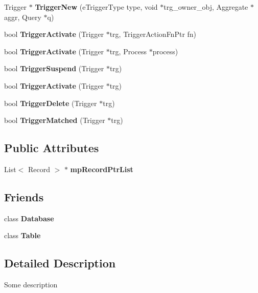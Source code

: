 \begin{CompactItemize}
\item 
Trigger $\ast$ {\bf Trigger\-New} (e\-Trigger\-Type type, void $\ast$trg\_\-owner\_\-obj, Aggregate $\ast$aggr, Query $\ast$q)\label{classView_a10}

\item 
bool {\bf Trigger\-Activate} (Trigger $\ast$trg, Trigger\-Action\-Fn\-Ptr fn)\label{classView_a11}

\item 
bool {\bf Trigger\-Activate} (Trigger $\ast$trg, Process $\ast$process)\label{classView_a12}

\item 
bool {\bf Trigger\-Suspend} (Trigger $\ast$trg)\label{classView_a13}

\item 
bool {\bf Trigger\-Activate} (Trigger $\ast$trg)\label{classView_a14}

\item 
bool {\bf Trigger\-Delete} (Trigger $\ast$trg)\label{classView_a15}

\item 
bool {\bf Trigger\-Matched} (Trigger $\ast$trg)\label{classView_a16}

\end{CompactItemize}
\subsection*{Public Attributes}
\begin{CompactItemize}
\item 
List$<$ Record $>$ $\ast$ {\bf mp\-Record\-Ptr\-List}\label{classView_o0}

\end{CompactItemize}
\subsection*{Friends}
\begin{CompactItemize}
\item 
class {\bf Database}\label{classView_n0}

\item 
class {\bf Table}\label{classView_n1}

\end{CompactItemize}


\subsection{Detailed Description}
Some description 



